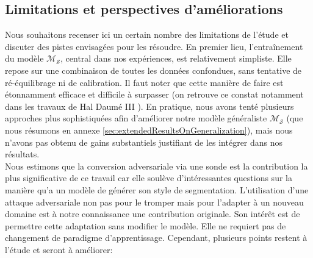 \subsection{Limitations et perspectives d'améliorations}
Nous souhaitons recenser ici un certain nombre des limitations de l'étude et discuter des pistes envisagées pour les résoudre. En premier lieu, l'entraînement du modèle $\mathcal{M}_\mathcal{S}$, central dans nos expériences, est relativement simpliste. Elle repose sur une combinaison de toutes les données confondues, sans tentative de ré-équilibrage ni de calibration. Il faut noter que cette manière de faire est étonnamment efficace et difficile à surpasser (on retrouve ce constat notamment dans les travaux de Hal Daumé III \cite{daumeiiiFrustratinglyEasyDomain2007}). En pratique, nous avons tenté plusieurs approches plus sophistiquées afin d'améliorer notre modèle généraliste $\mathcal{M}_\mathcal{S}$ (que nous résumons en annexe \ref{sec:extendedResultsOnGeneralization}), mais nous n'avons pas obtenu de gains substantiels justifiant de les intégrer dans nos résultats. \\
Nous estimons que la conversion adversariale via une sonde est la contribution la plus significative de ce travail car elle soulève d'intéressantes questions sur la manière qu'a un modèle de générer son style de segmentation. L'utilisation d'une attaque adversariale non pas pour le tromper mais pour l'adapter à un nouveau domaine est à notre connaissance une contribution originale. Son intérêt est de permettre cette adaptation sans modifier le modèle. Elle ne requiert pas de changement de paradigme d'apprentissage. Cependant, plusieurs points restent à l'étude et seront à améliorer:
